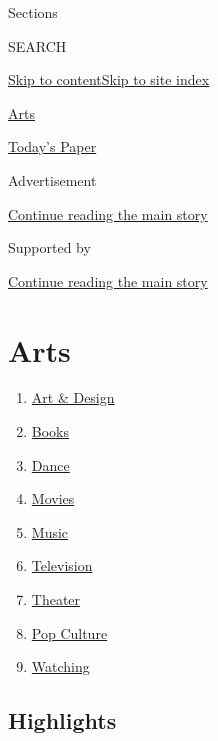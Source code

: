 Sections

SEARCH

\protect\hyperlink{site-content}{Skip to
content}\protect\hyperlink{site-index}{Skip to site index}

\href{https://www.nytimes.com/section/arts}{Arts}

\href{https://myaccount.nytimes.com/auth/login?response_type=cookie\&client_id=vi}{}

\href{https://www.nytimes.com/section/todayspaper}{Today's Paper}

Advertisement

\protect\hyperlink{after-top}{Continue reading the main story}

Supported by

\protect\hyperlink{after-sponsor}{Continue reading the main story}

\hypertarget{arts}{%
\section{Arts}\label{arts}}

\begin{enumerate}
\def\labelenumi{\arabic{enumi}.}
\tightlist
\item
  \href{/section/arts/design}{Art \& Design}
\item
  \href{/section/books}{Books}
\item
  \href{/section/arts/dance}{Dance}
\item
  \href{/section/movies}{Movies}
\item
  \href{/section/arts/music}{Music}
\item
  \href{/section/arts/television}{Television}
\item
  \href{/section/theater}{Theater}
\item
  \href{/spotlight/pop-culture}{Pop Culture}
\item
  \href{/watching}{Watching}
\end{enumerate}

\hypertarget{highlights}{%
\subsection{Highlights}\label{highlights}}

